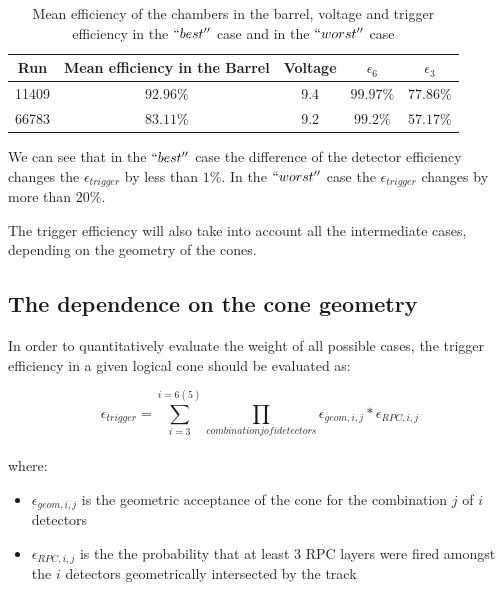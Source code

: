 \begin{table}[htb]
  \label{tab:meaneffs}
    \begin{center}
      \begin{tabular}{|c|c|c|c|c|} \hline
Run & Mean efficiency in the Barrel & Voltage & $\epsilon_{6}$ & $\epsilon_{3}$\\ \hline
11409 &	$92.96 \%$ & 9.4 & $99.97 \%$ & $77.86 \%$  \\ \hline
66783 & $83.11 \%$ & 9.2 & $99.2 \%$ & $57.17 \%$ \\ \hline
      \end{tabular}
         \caption{ Mean efficiency of the chambers in the barrel, voltage and trigger efficiency in the $``best''$ case and in the $``worst''$ case 
}
 \end{center}
\end{table} 

We can see that in the $ ``best'' $ case the 
difference of the detector efficiency changes the $\epsilon_{trigger}$ 
by less than $1\%$.
In the  $ ``worst''$ case the $\epsilon_{trigger}$ changes by more than $20\%$.


The trigger efficiency will also take into account
all the intermediate cases, depending on the geometry of the cones. 

\subsection{The dependence on the cone geometry}

In order to quantitatively evaluate the weight of all possible cases,
the trigger efficiency in a given logical cone should be evaluated as:

\begin{equation}
\label{efficiency}
\epsilon_{trigger} = \sum_{i=3}^{i=6(5)}\prod_{combination j of i detectors} \epsilon_{geom,i,j} * \epsilon_{RPC,i,j}    
\end{equation} 
\\

where:\\
\begin{itemize}
\item $\epsilon_{geom,i,j}$ is the geometric acceptance of
 the cone for the combination $j$ of $i$ detectors
\item $\epsilon_{RPC,i,j}$ is the the probability that 
at least 3 RPC layers were fired amongst the $i$ detectors
geometrically intersected by the track
\end{itemize}


